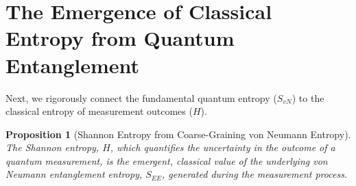 \documentclass[11pt, letterpaper]{report}
\theoremstyle{plain} %
\newtheorem{proposition}[theorem]{Proposition}
\theoremstyle{definition} %
\theoremstyle{remark} %
\begin{document}
\section{The Emergence of Classical Entropy from Quantum Entanglement}
\label{app:svn_shannon_emergence}

Next, we rigorously connect the fundamental quantum entropy ($S_{vN}$) to the classical entropy of measurement outcomes ($H$).

\begin{proposition}[Shannon Entropy from Coarse-Graining von Neumann Entropy]
\label{prop:shannon_from_vn}
The Shannon entropy, $H$, which quantifies the uncertainty in the outcome of a quantum measurement, is the emergent, classical value of the underlying von Neumann entanglement entropy, $S_{EE}$, generated during the measurement process.
\end{proposition}
\end{document}
